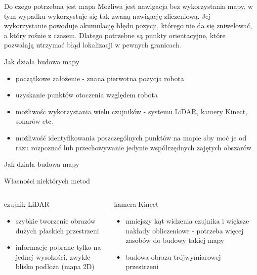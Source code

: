 

\begin{frame}{Do czego potrzebna jest mapa}
	Możliwa jest nawigacja bez wykorzystania mapy, w tym wypadku wykorzystuje się tak zwaną nawigację zliczeniową. 
	Jej wykorzystanie powoduje akumulację błędu pozycji, którego nie da się zniwelować,
	a który rośnie z czasem.
	Dlatego potrzebne są punkty orientacyjne, które pozwalają utrzymać błąd lokalizacji w pewnych granicach.
	
\end{frame}

\begin{frame}{Jak działa budowa mapy}
	\begin{itemize}
		\item początkowe założenie - znana pierwotna pozycja robota
		\item uzyskanie punktów otoczenia względem robota
		\item możliwośc wykorzystania wielu czujników - systemu LiDAR, kamery Kinect, sonarów etc.
		\item możliwość identyfikowania poszczególnych punktów na mapie aby moć je od razu rozpoznać lub przechowywanie jedynie współrzędnych zajętych obszarów
	\end{itemize}
\end{frame}

\begin{frame}{Jak działa budowa mapy}
\end{frame}

\begin{frame}{Własności niektórych metod}
	\begin{columns}
		\begin{column}{0.5\textwidth}
			\begin{center}
				czujnik LiDAR
			\end{center}
			\begin{itemize}
				\item szybkie tworzenie obrazów dużych płaskich przestrzeni
				\item informacje pobrane tylko na jednej wysokości, zwykle blisko podłoża (mapa 2D)
			\end{itemize}
		\end{column}
		\begin{column}{0.5\textwidth}  %
			\begin{center}
				kamera Kinect
			\end{center}
			\begin{itemize}
				\item mniejszy kąt widzenia czujnika i większe nakłady obliczeniowe - potrzeba więcej zasobów do budowy takiej mapy				
				\item budowa obrazu trójwymiarowej przestrzeni
			\end{itemize}
		\end{column}
	\end{columns}
\end{frame}
